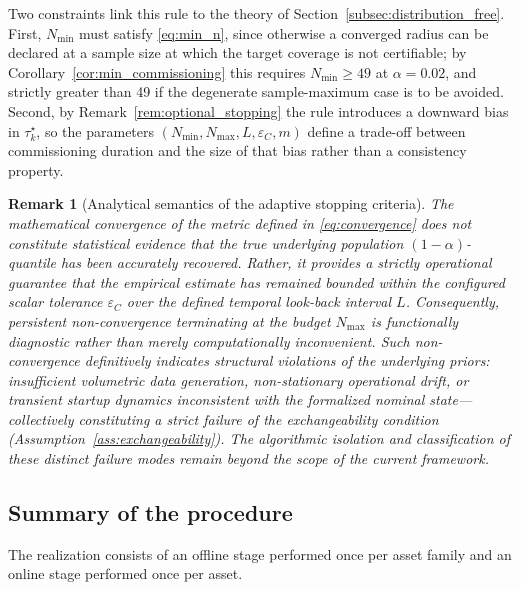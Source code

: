 \documentclass[a4paper]{cas-sc}
\newtheorem{remark}{Remark}
\begin{document}
Two constraints link this rule to the theory of
Section~\ref{subsec:distribution_free}. First, \(N_{\min}\) must satisfy
\eqref{eq:min_n}, since otherwise a converged radius can be declared at a
sample size at which the target coverage is not certifiable; by
Corollary~\ref{cor:min_commissioning} this requires
\(N_{\min}\ge 49\) at \(\alpha=0.02\), and strictly greater than 49 if the
degenerate sample-maximum case is to be avoided. Second, by
Remark~\ref{rem:optional_stopping} the rule introduces a downward bias in
\(\tau_k^\star\), so the parameters
\((N_{\min},N_{\max},L,\varepsilon_C,m)\) define a trade-off between
commissioning duration and the size of that bias rather than a
consistency property.

\begin{remark}[Analytical semantics of the adaptive stopping criteria]
\label{rem:stopping_semantics}
The mathematical convergence of the metric defined in \eqref{eq:convergence} does not constitute statistical evidence that the true underlying population \((1-\alpha)\)-quantile has been accurately recovered. Rather, it provides a strictly operational guarantee that the empirical estimate has remained bounded within the configured scalar tolerance \(\varepsilon_C\) over the defined temporal look-back interval \(L\). Consequently, persistent non-convergence terminating at the budget \(N_{\max}\) is functionally diagnostic rather than merely computationally inconvenient. Such non-convergence definitively indicates structural violations of the underlying priors: insufficient volumetric data generation, non-stationary operational drift, or transient startup dynamics inconsistent with the formalized nominal state—collectively constituting a strict failure of the exchangeability condition (Assumption~\ref{ass:exchangeability}). The algorithmic isolation and classification of these distinct failure modes remain beyond the scope of the current framework.
\end{remark}

\subsection{Summary of the procedure}
\label{subsec:procedure_summary}

The realization consists of an offline stage performed once per asset
family and an online stage performed once per asset.
\end{document}
